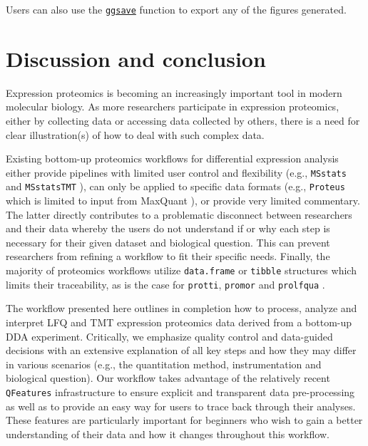 \documentclass[9pt,a4paper,]{extarticle}
\begin{document}
Users can also use the \href{https://www.rdocumentation.org/packages/ggplot2/versions/0.9.0/topics/ggsave}{\texttt{ggsave}}
function to export any of the figures generated.

\section{Discussion and conclusion}\label{discussion-and-conclusion}

Expression proteomics is becoming an increasingly important tool in modern
molecular biology. As more researchers participate in expression proteomics,
either by collecting data or accessing data collected by others, there is a need
for clear illustration(s) of how to deal with such complex data.

Existing bottom-up proteomics workflows for differential expression analysis
either provide pipelines with limited user control and flexibility (e.g., \texttt{MSstats}
and \texttt{MSstatsTMT} \citep{Choi2014, Huang2020}), can only be applied to specific data
formats (e.g., \texttt{Proteus} which is limited to input from MaxQuant \citep{Gierlinski2018}),
or provide very limited commentary. The latter directly contributes to a
problematic disconnect between researchers and their data whereby the users do
not understand if or why each step is necessary for their given dataset and
biological question. This can prevent researchers from refining a workflow to fit
their specific needs. Finally, the majority of proteomics workflows utilize
\texttt{data.frame} or \texttt{tibble} structures which limits their traceability, as is the
case for \texttt{protti}, \texttt{promor} and \texttt{prolfqua} \citep{Ranathunge2022, Quast2021, Wolski2022}.

The workflow presented here outlines in completion how to process, analyze and
interpret LFQ and TMT expression proteomics data derived from a bottom-up DDA
experiment. Critically, we emphasize quality control and data-guided decisions
with an extensive explanation of all key steps and how they may differ in
various scenarios (e.g., the quantitation method, instrumentation and biological
question). Our workflow takes advantage of the relatively recent \texttt{QFeatures}
infrastructure to ensure explicit and transparent data pre-processing as well as
to provide an easy way for users to trace back through their analyses. These
features are particularly important for beginners who wish to gain a better
understanding of their data and how it changes throughout this workflow.
\end{document}
